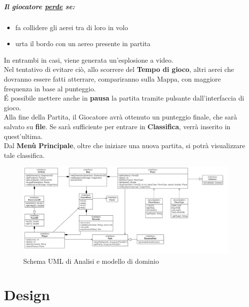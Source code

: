 \documentclass[a4paper,12pt]{report}
\begin{document}
\paragraph{Il giocatore \underline{perde} se:}
\begin{itemize}
    \item fa collidere gli aerei tra di loro in volo
    \item urta il bordo con un aereo presente in partita
\end{itemize}
In entrambi in casi, viene generata un'esplosione a video.
\\
Nel tentativo di evitare ciò, allo scorrere del \textbf{Tempo di gioco}, altri aerei che dovranno essere fatti atterrare, compariranno sulla Mappa, con maggiore frequenza in base al punteggio.
\\
É possibile mettere anche in \textbf{pausa} la partita tramite pulsante dall’interfaccia di gioco.
\\
Alla fine della Partita, il Giocatore avrà ottenuto un punteggio finale, che sarà salvato su \textbf{file}. Se sarà sufficiente per entrare in \textbf{Classifica}, verrà inserito in quest’ultima.
\\
Dal \textbf{Menù Principale}, oltre che iniziare una nuova partita, si potrà visualizzare tale classifica.
\begin{figure}[H]
    \begin{center}
        \centering
        \includegraphics[width=\textwidth]{img/Analisi/Analisi.png}
    \end{center}
    \caption{Schema UML di Analisi e modello di dominio}
    \label{img:analisi}
\end{figure}

\chapter{Design}

\end{document}
